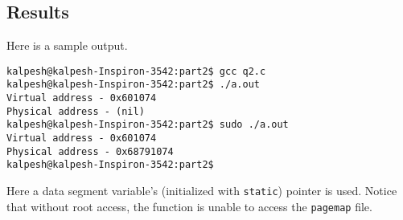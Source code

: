 \documentclass[a4paper,12pt]{article}
\begin{document}
\subsection{Results}
Here is a sample output.
\begin{lstlisting}
kalpesh@kalpesh-Inspiron-3542:part2$ gcc q2.c 
kalpesh@kalpesh-Inspiron-3542:part2$ ./a.out 
Virtual address - 0x601074
Physical address - (nil)
kalpesh@kalpesh-Inspiron-3542:part2$ sudo ./a.out 
Virtual address - 0x601074
Physical address - 0x68791074
kalpesh@kalpesh-Inspiron-3542:part2$ 
\end{lstlisting}
Here a data segment variable's (initialized with \texttt{static}) pointer is used. Notice that without root access, the function is unable to access the \texttt{pagemap} file.
\end{document}
